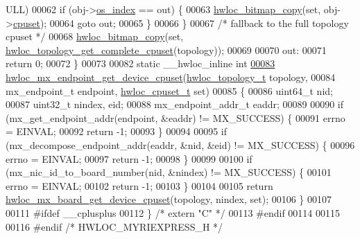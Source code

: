 \begin{DoxyCode}
      ULL)
00062       \textcolor{keywordflow}{if} (obj->\hyperlink{a00016_a61a7a80a68eaccbaaa28269e678c81a9}{os_index} == out) \{
00063         \hyperlink{a00065_gab14743355fa03b36cef521cbcd2fbf64}{hwloc_bitmap_copy}(\textcolor{keyword}{set}, obj->\hyperlink{a00016_a67925e0f2c47f50408fbdb9bddd0790f}{cpuset});
00064         \textcolor{keywordflow}{goto} out;
00065       \}
00066   \}
00067   \textcolor{comment}{/* fallback to the full topology cpuset */}
00068   \hyperlink{a00065_gab14743355fa03b36cef521cbcd2fbf64}{hwloc_bitmap_copy}(\textcolor{keyword}{set}, \hyperlink{a00060_ga418ebb39eaf1eac8f9cf4047cf59a534}{hwloc_topology_get_complete_cpuset}(topology));
00069 
00070  out:
00071   \textcolor{keywordflow}{return} 0;
00072 \}
00073 
00082 \textcolor{keyword}{static} \_\_hwloc\_inline \textcolor{keywordtype}{int}
\hypertarget{a00036_source_l00083}{}\hyperlink{a00073_ga2ff7763b9c2c5975f9a2e3d638351535}{00083} \hyperlink{a00073_ga2ff7763b9c2c5975f9a2e3d638351535}{hwloc_mx_endpoint_get_device_cpuset}(\hyperlink{a00039_ga9d1e76ee15a7dee158b786c30b6a6e38}{hwloc_topology_t} topology,
00084                                     mx\_endpoint\_t endpoint, \hyperlink{a00040_ga4bbf39b68b6f568fb92739e7c0ea7801}{hwloc_cpuset_t} \textcolor{keyword}{set})
00085 \{
00086   uint64\_t nid;
00087   uint32\_t nindex, eid;
00088   mx\_endpoint\_addr\_t eaddr;
00089 
00090   \textcolor{keywordflow}{if} (mx\_get\_endpoint\_addr(endpoint, &eaddr) != MX\_SUCCESS) \{
00091     errno = EINVAL;
00092     \textcolor{keywordflow}{return} -1;
00093   \}
00094 
00095   \textcolor{keywordflow}{if} (mx\_decompose\_endpoint\_addr(eaddr, &nid, &eid) != MX\_SUCCESS) \{
00096     errno = EINVAL;
00097     \textcolor{keywordflow}{return} -1;
00098   \}
00099 
00100   \textcolor{keywordflow}{if} (mx\_nic\_id\_to\_board\_number(nid, &nindex) != MX\_SUCCESS) \{
00101     errno = EINVAL;
00102     \textcolor{keywordflow}{return} -1;
00103   \}
00104 
00105   \textcolor{keywordflow}{return} \hyperlink{a00073_ga87f4746d0cad579ce4e86b98088f22a1}{hwloc_mx_board_get_device_cpuset}(topology, nindex, \textcolor{keyword}{set});
00106 \}
00107 
00111 \textcolor{preprocessor}{#ifdef \_\_cplusplus}
00112 \textcolor{preprocessor}{}\} \textcolor{comment}{/* extern "C" */}
00113 \textcolor{preprocessor}{#endif}
00114 \textcolor{preprocessor}{}
00115 
00116 \textcolor{preprocessor}{#endif }\textcolor{comment}{/* HWLOC\_MYRIEXPRESS\_H */}
\end{DoxyCode}
